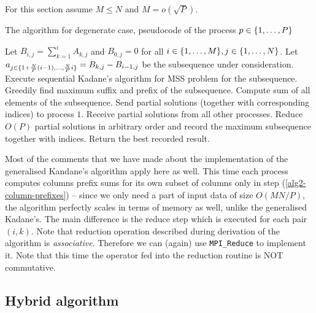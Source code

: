 For this section assume $M \leq N$ and $M = o(\sqrt{P})$.

\begin{algorithm}[h]
    \caption{The algorithm for degenerate case, pseudocode of the process $p \in \{ 1, \dots, P \}$}
    \begin{algorithmic}[1]
        \State Let $B_{i, j} = \sum_{k = 1}^{i}{A_{k, j}}$ and $B_{0, j} = 0$ for all $i \in \{ 1, \dots, M \}, j \in \{ 1, \dots, N \}$. \label{alg2-column-prefixes}
                \State Let $a_{j \in \{ 1 + \frac{N}{P} (i - 1), \dots, \frac{N}{P} i \}} = B_{k, j} - B_{i-1, j}$ be the subsequence under consideration.
                \State Execute sequential Kadane's algorithm for MSS problem for the subsequence.
                \State Greedily find maximum suffix and prefix of the subsequence.
                \State Compute sum of all elements of the subsequence.
                    \State Send partial solutions (together with corresponding indices) to process $1$.
                \Else
                    \State Receive partial solutions from all other processes.
                    \State Reduce $O(P)$ partial solutions in arbitrary order and record the maximum subsequence together with indices.
                \EndIf
            \EndFor
        \EndFor
            \State Return the best recorded result.
        \EndIf
    \end{algorithmic}
\end{algorithm}

Most of the comments that we have made about the implementation of the generalised Kandane's algorithm apply here as well.
This time each process computes columns prefix sums for its own subset of columns only in step (\ref{alg2-column-prefixes}) -- since we only need a part of input data of size $O(MN / P)$, the algorithm perfectly scales in terms of memory as well, unlike the generalised Kadane's.
The main difference is the reduce step which is executed for each pair $(i, k)$.
Note that reduction operation described during derivation of the algorithm is \emph{associative}.
Therefore we can (again) use \verb+MPI_Reduce+ to implement it.
Note that this time the operator fed into the reduction routine is NOT commutative.

\subsection*{Hybrid algorithm}

